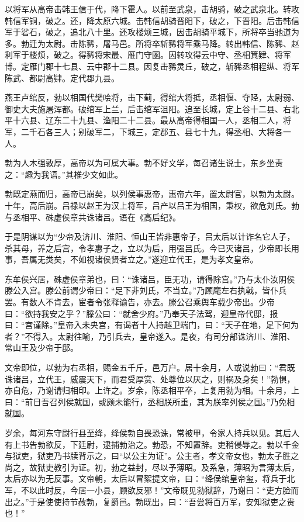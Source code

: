 \documentclass[12pt,UTF8]{ctexbook}
\begin{document}
以将军从高帝击韩王信于代，降下霍人。以前至武泉，击胡骑，破之武泉北。转攻韩信军铜，破之。还，降太原六城。击韩信胡骑晋阳下，破之，下晋阳。后击韩信军于硰石，破之，追北八十里。还攻楼烦三城，因击胡骑平城下，所将卒当驰道为多。勃迁为太尉。击陈豨，屠马邑。所将卒斩豨将军乘马降。转出韩信、陈豨、赵利军于楼烦，破之。得豨将宋最、雁门守圂。因转攻得云中守、丞相箕肄、将军博。定雁门郡十七县、云中郡十二县。因复击豨灵丘，破之，斩豨丞相程纵、将军陈武、都尉高肄。定代郡九县。



燕王卢绾反，勃以相国代樊哙将，击下蓟，得绾大将抵，丞相偃、夺陉，太尉弱、御史大夫施屠浑都。破绾军上兰，后击绾军沮阳。追至长城，定上谷十二县、右北平十六县、辽东二十九县、渔阳二十二县。最从高帝得相国一人，丞相二人，将军，二千石各三人；别破军二，下城三，定郡五、县七十九，得丞相、大将各一人。



勃为人木强敦厚，高帝以为可属大事。勃不好文学，每召诸生说士，东乡坐责之：“趣为我语。”其椎少文如此。



勃既定燕而归，高帝已崩矣，以列侯事惠帝，惠帝六年，置太尉官，以勃为太尉。十年，高后崩。吕禄以赵王为汉上将军，吕产以吕王为相国，秉权，欲危刘氏。勃与丞相平、硃虚侯章共诛诸吕。语在《高后纪》。



于是阴谋以为“少帝及济川、淮阳、恒山王皆非惠帝子，吕太后以计诈名它人子，杀其母，养之后宫，令孝惠子之，立以为后，用强吕氏。今已灭诸吕，少帝即长用事，吾属无类矣，不如视诸侯贤者立之。”遂迎立代王，是为孝文皇帝。



东牟侯兴居，硃虚侯章弟也，曰：“诛诸吕，臣无功，请得除宫。”乃与太仆汝阴侯滕公入宫。滕公前谓少帝曰：“足下非刘氏，不当立。”乃顾麾左右执戟，皆仆兵罢。有数人不肯去，宦者令张释谕告，亦去。滕公召乘舆车载少帝出。少帝曰：“欲持我安之乎？”滕公曰：“就舍少府。”乃奉天子法驾，迎皇帝代邸，报曰：“宫谨除。”皇帝入未央宫，有谒者十人持越卫端门，曰：“天子在地，足下何为者？”不得入。太尉往喻，乃引兵去，皇帝遂入。是夜，有司分部诛济川、淮阳、常山王及少帝于邸。



文帝即位，以勃为右丞相，赐金五千斤，邑万户。居十余月，人或说勃曰：“君既诛诸吕，立代王，威震天下，而君受厚赏、处尊位以厌之，则祸及身矣！”勃惧，亦自危，乃谢请归相印。上许之。岁余，陈丞相平卒，上复用勃为相。十余月，上曰：“前日吾召列侯就国，或颇未能行，丞相朕所重，其为朕率列侯之国。”乃免相就国。



岁余，每河东守尉行县至绛，绛侯勃自畏恐诛，常被甲，令家人持兵以见。其后人有上书告勃欲反，下廷尉，逮捕勃治之。勃恐，不知置辞。吏稍侵辱之。勃以千金与狱吏，狱吏乃书牍背示之，曰“以公主为证”。公主者，孝文帝女也，勃太子胜之尚之，故狱吏教引为证。初，勃之益封，尽以予薄昭。及系急，薄昭为言薄太后，太后亦以为无反事。文帝朝，太后以冒絮提文帝，曰：“绛侯绾皇帝玺，将兵于北军，不以此时反，今居一小县，顾欲反邪！”文帝既见勃狱辞，乃谢曰：“吏方脸而出之。”于是使使持节赦勃，复爵邑。勃既出，曰：“吾尝将百万军，安知狱吏之贵也！”
\end{document}
